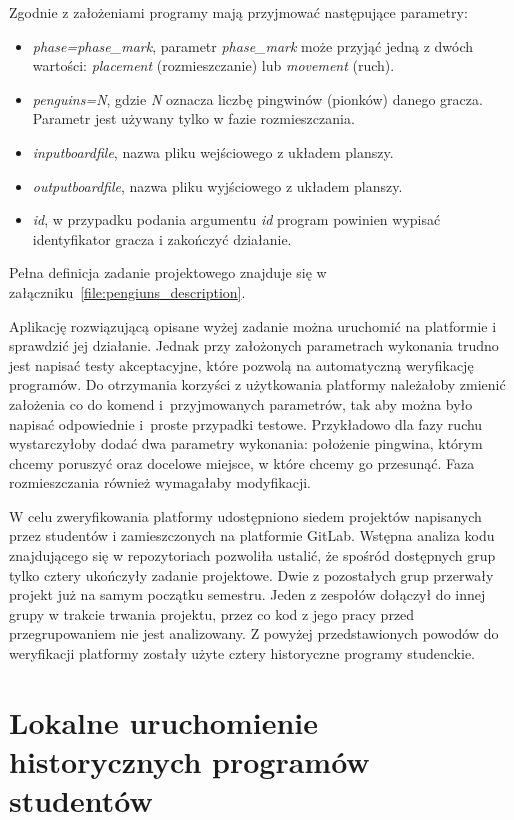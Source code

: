Zgodnie z założeniami programy mają przyjmować następujące parametry:
\begin{itemize}
    \item \textit{phase=phase\_mark}, parametr \textit{phase\_mark} może przyjąć jedną z dwóch wartości: \textit{placement} (rozmieszczanie) lub \textit{movement} (ruch).
    \item \textit{penguins=N}, gdzie \textit{N} oznacza liczbę pingwinów (pionków) danego gracza.
    Parametr jest używany tylko w fazie rozmieszczania.
    \item \textit{inputboardfile}, nazwa pliku wejściowego z układem planszy.
    \item \textit{outputboardfile}, nazwa pliku wyjściowego z układem planszy.
    \item \textit{id}, w przypadku podania argumentu \textit{id} program powinien wypisać identyfikator gracza i zakończyć działanie.
\end{itemize}
Pełna definicja zadanie projektowego znajduje się w załączniku~\ref{file:pengiuns_description}.

Aplikację rozwiązującą opisane wyżej zadanie można uruchomić na platformie i sprawdzić jej działanie.
Jednak przy założonych parametrach wykonania trudno jest napisać testy akceptacyjne, które pozwolą na automatyczną weryfikację programów.
Do otrzymania korzyści z użytkowania platformy należałoby zmienić założenia co do komend i~przyjmowanych parametrów, tak aby można było napisać odpowiednie i~proste przypadki testowe.
Przykładowo dla fazy ruchu wystarczyłoby dodać dwa parametry wykonania: położenie pingwina, którym chcemy poruszyć oraz docelowe miejsce, w które chcemy go przesunąć.
Faza rozmieszczania również wymagałaby modyfikacji.

W celu zweryfikowania platformy udostępniono siedem projektów napisanych przez studentów i zamieszczonych na platformie GitLab.
Wstępna analiza kodu znajdującego się w repozytoriach pozwoliła ustalić, że spośród dostępnych grup tylko cztery ukończyły zadanie projektowe.
Dwie z pozostałych grup przerwały projekt już na samym początku semestru.
Jeden z zespołów dołączył do innej grupy w trakcie trwania projektu, przez co kod z jego pracy przed przegrupowaniem nie jest analizowany.
Z powyżej przedstawionych powodów do weryfikacji platformy zostały użyte cztery historyczne programy studenckie.

\section{Lokalne uruchomienie historycznych programów studentów}

